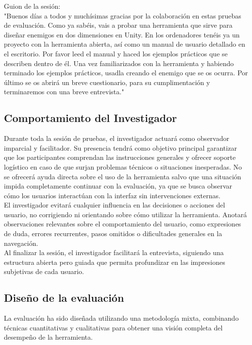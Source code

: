 Guion de la sesión:\\

"Buenos días a todos y muchísimas gracias por la colaboración en estas pruebas de evaluación.
Como ya sabéis, vais a probar una herramienta que sirve para diseñar enemigos en dos dimensiones en Unity.
En los ordenadores tenéis ya un proyecto con la herramienta abierta, así como un manual de usuario detallado en el escritorio.
Por favor leed el manual y haced los ejemplos prácticos que se describen dentro de él. Una vez familiarizados con la herramienta y habiendo terminado los ejemplos prácticos, usadla creando el enemigo que se os ocurra.
Por último se os abrirá un breve cuestionario, para su cumplimentación y terminaremos con una breve entrevista."

\subsection{Comportamiento del Investigador}

Durante toda la sesión de pruebas, el investigador actuará como observador imparcial y facilitador. Su presencia tendrá como objetivo principal garantizar que los participantes comprendan las instrucciones generales y ofrecer soporte logístico en caso de que surjan problemas técnicos o situaciones inesperadas. No se ofrecerá ayuda directa sobre el uso de la herramienta salvo que una situación impida completamente continuar con la evaluación, ya que se busca observar cómo los usuarios interactúan con la interfaz sin intervenciones externas.\\

El investigador evitará cualquier influencia en las decisiones o acciones del usuario, no corrigiendo ni orientando sobre cómo utilizar la herramienta. Anotará observaciones relevantes sobre el comportamiento del usuario, como expresiones de duda, errores recurrentes, pasos omitidos o dificultades generales en la navegación.\\

Al finalizar la sesión, el investigador facilitará la entrevista, siguiendo una estructura abierta pero guiada que permita profundizar en las impresiones subjetivas de cada usuario.\\

\subsection{Diseño de la evaluación}

La evaluación ha sido diseñada utilizando una metodología mixta, combinando técnicas cuantitativas y cualitativas para obtener una visión completa del desempeño de la herramienta.
